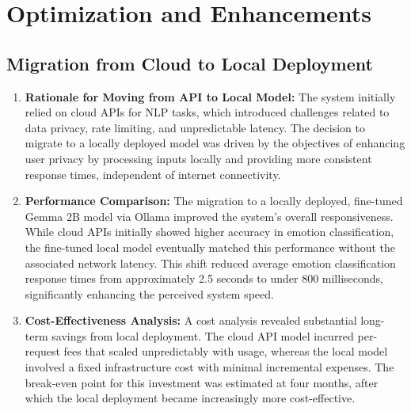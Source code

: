 \documentclass[conference]{IEEEtran}
\begin{document}
%

\section{Optimization and Enhancements}
\subsection{Migration from Cloud to Local Deployment}
\begin{enumerate}
    \item \textbf{Rationale for Moving from API to Local Model:} The system initially relied on cloud APIs for NLP tasks, which introduced challenges related to data privacy, rate limiting, and unpredictable latency. The decision to migrate to a locally deployed model was driven by the objectives of enhancing user privacy by processing inputs locally and providing more consistent response times, independent of internet connectivity.
    \item \textbf{Performance Comparison:} The migration to a locally deployed, fine-tuned Gemma 2B model via Ollama improved the system's overall responsiveness. While cloud APIs initially showed higher accuracy in emotion classification, the fine-tuned local model eventually matched this performance without the associated network latency. This shift reduced average emotion classification response times from approximately 2.5 seconds to under 800 milliseconds, significantly enhancing the perceived system speed.
    \item \textbf{Cost-Effectiveness Analysis:} A cost analysis revealed substantial long-term savings from local deployment. The cloud API model incurred per-request fees that scaled unpredictably with usage, whereas the local model involved a fixed infrastructure cost with minimal incremental expenses. The break-even point for this investment was estimated at four months, after which the local deployment became increasingly more cost-effective.
\end{enumerate}
\end{document}
